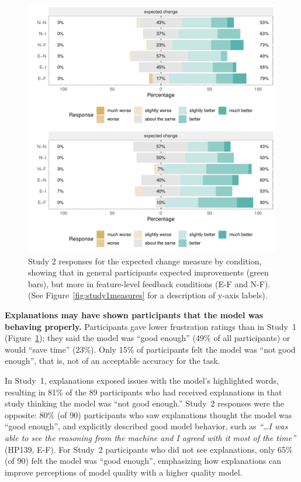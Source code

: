 \begin{figure}[t]
    \centering
    \includegraphics[width=.48\textwidth]{2020_chi_explanation/figures/exp-plots-study2.pdf}
    \caption{Study 2 responses for the expected change measure by condition, showing that in general participants expected improvements (green bars), but more in feature-level feedback conditions (E-F and N-F). (See Figure~\ref{fig:study1measures} for a description of y-axis labels).}
    \label{fig:study2exp}
    \vspace{-10pt}
\end{figure}


\textbf{Explanations may have shown participants that the model was behaving properly.}
%
Participants gave lower frustration ratings than in Study~1 (Figure~\ref{fig:study2exp}); they said the model was ``good enough'' (49\% of all participants) or would ``save time'' (23\%). Only 15\% of participants felt the model was ``not good enough'', that is, not of an acceptable accuracy for the task. 

In Study~1, explanations exposed issues with the model's highlighted words, resulting in 81\% of the 89 participants who had received explanations in that study thinking the model was ``not good enough.'' Study~2 responses were the opposite: 80\% (of 90) participants who saw explanations thought the model was ``good enough'', and  explicitly described good model behavior, such as \textit{``\dots I was able to see the reasoning from the machine and I agreed with it most of the time''} (HP139, E-F). For Study~2 participants who did not see explanations, only 65\% (of 90) felt the model was ``good enough'', emphasizing how explanations can improve perceptions of model quality with a higher quality model. 


